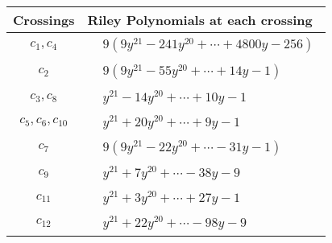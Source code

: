 \documentclass[1p]{elsarticle_modified}
\theoremstyle{definition}
\begin{document}
\begin{tabular}{m{50pt}|m{274pt}}
Crossings & \hspace{64pt}Riley Polynomials at each crossing \\
\hline $$\begin{aligned}c_{1},c_{4}\end{aligned}$$&$\begin{aligned}
&9(9 y^{21}-241 y^{20}+\cdots+4800 y-256)
\end{aligned}$\\
\hline $$\begin{aligned}c_{2}\end{aligned}$$&$\begin{aligned}
&9(9 y^{21}-55 y^{20}+\cdots+14 y-1)
\end{aligned}$\\
\hline $$\begin{aligned}c_{3},c_{8}\end{aligned}$$&$\begin{aligned}
&y^{21}-14 y^{20}+\cdots+10 y-1
\end{aligned}$\\
\hline $$\begin{aligned}c_{5},c_{6},c_{10}\end{aligned}$$&$\begin{aligned}
&y^{21}+20 y^{20}+\cdots+9 y-1
\end{aligned}$\\
\hline $$\begin{aligned}c_{7}\end{aligned}$$&$\begin{aligned}
&9(9 y^{21}-22 y^{20}+\cdots-31 y-1)
\end{aligned}$\\
\hline $$\begin{aligned}c_{9}\end{aligned}$$&$\begin{aligned}
&y^{21}+7 y^{20}+\cdots-38 y-9
\end{aligned}$\\
\hline $$\begin{aligned}c_{11}\end{aligned}$$&$\begin{aligned}
&y^{21}+3 y^{20}+\cdots+27 y-1
\end{aligned}$\\
\hline $$\begin{aligned}c_{12}\end{aligned}$$&$\begin{aligned}
&y^{21}+22 y^{20}+\cdots-98 y-9
\end{aligned}$\\
\hline
\end{tabular}\\~\\
\end{document}
